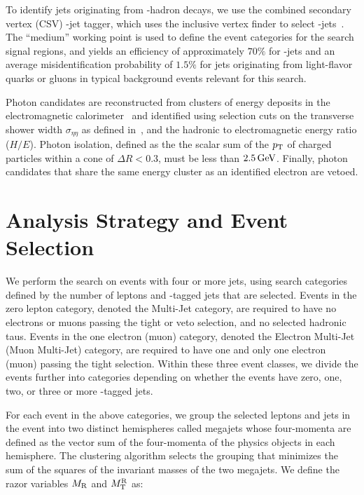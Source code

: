To identify jets originating from \PB-hadron decays, we use the
combined secondary vertex (CSV) \cPqb-jet tagger, which uses the inclusive
vertex finder to select \cPqb-jets~\cite{CMS-PAS-BTV-15-001}. The ``medium'' 
working point is used to define the event categories for the search signal regions,
and yields an efficiency of approximately $70\%$ for \cPqb-jets and an average 
misidentification probability of $1.5\%$ for jets originating from light-flavor 
quarks or gluons in typical background events relevant for this search.

Photon candidates are reconstructed from clusters of energy deposits in the electromagnetic
calorimeter~\cite{Khachatryan:2015iwa} and identified using 
selection cuts on the transverse shower width $\sigma_{\eta\eta}$ as defined 
in~\cite{Khachatryan:2015iwa}, and the hadronic to electromagnetic energy ratio ($H/E$). 
Photon isolation, defined as the 
the scalar sum of the $p_{\mathrm{T}}$ of charged particles within a cone of
$\Delta R<0.3$, must be less than $2.5 \,\text{Ge\hspace{-.08em}V}$. Finally, photon candidates that share
the same energy cluster as an identified electron are vetoed. 


\section{Analysis Strategy and Event Selection }
\label{sec:StrategySelection}

We perform the search on events with four or more jets, using search categories
defined by the number of leptons and \cPqb-tagged jets that are selected. Events in the
zero lepton category, denoted the Multi-Jet category, are required to have no 
electrons or muons passing the tight or veto selection, and no selected hadronic taus. 
Events in the one electron (muon) category, denoted the Electron Multi-Jet (Muon Multi-Jet) category,
are required to have one and only one electron (muon) passing the tight selection.
Within these three event classes, we divide the events further into categories depending on
whether the events have zero, one, two, or three or more \cPqb-tagged jets. 

For each event in the above categories, we group the selected leptons 
and jets in the event into two distinct hemispheres called megajets whose four-momenta are 
defined as the vector sum of the four-momenta of the physics objects in each hemisphere. The
clustering algorithm selects the grouping that minimizes the sum of the squares of the invariant masses
of the two megajets. We define the razor variables $M_\mathrm{R}$ and $M_\mathrm{T}^\mathrm{R}$ as:

